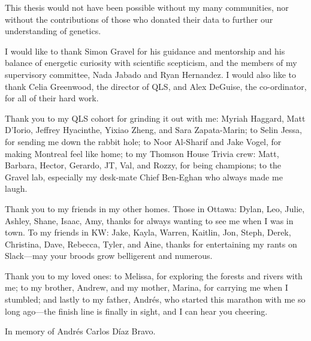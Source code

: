 This thesis would not have been possible without my many communities, nor without the contributions of those who donated their data to further our understanding of genetics.

I would like to thank Simon Gravel for his guidance and mentorship and his balance of energetic curiosity with scientific scepticism, and the members of my supervisory committee, Nada Jabado and Ryan Hernandez. I would also like to thank Celia Greenwood, the director of QLS, and Alex DeGuise, the co-ordinator, for all of their hard work.

Thank you to my QLS cohort for grinding it out with me: Myriah Haggard, Matt D'Iorio, Jeffrey Hyacinthe, Yixiao Zheng, and Sara Zapata-Marin; to Selin Jessa, for sending me down the rabbit hole; to Noor Al-Sharif and Jake Vogel, for making Montreal feel like home; to my Thomson House Trivia crew: Matt, Barbara, Hector, Gerardo, JT, Val, and Rozzy, for being champions; to the Gravel lab, especially my desk-mate Chief Ben-Eghan who always made me laugh.

Thank you to my friends in my other homes. Those in Ottawa: Dylan, Leo, Julie, Ashley, Shane, Isaac, Amy, thanks for always wanting to see me when I was in town. To my friends in KW: Jake, Kayla, Warren, Kaitlin, Jon, Steph, Derek, Christina, Dave, Rebecca, Tyler, and Aine, thanks for entertaining my rants on Slack---may your broods grow belligerent and numerous.

Thank you to my loved ones: to Melissa, for exploring the forests and rivers with me; to my brother, Andrew, and my mother, Marina, for carrying me when I stumbled; and lastly to my father, Andr\'{e}s, who started this marathon with me so long ago---the finish line is finally in sight, and I can hear you cheering.

\pagebreak
\hspace{0pt}
\vfill

\begin{center}
In memory of Andr\'{e}s Carlos D\'{i}az Bravo.
\end{center}

\vfill
\hspace{0pt}
\pagebreak
